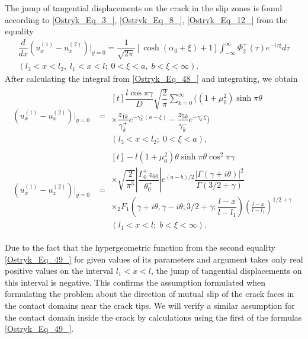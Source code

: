 The jump of tangential displacements on the crack in the slip zones is found according to \eqref{Ostryk_Eq_3_}, \eqref{Ostryk_Eq_8_}, \eqref{Ostryk_Eq_12_} from the equality
\begin{multline} \label{Ostryk_Eq_48_} 
\dfrac{d}{dx} \left(u_{x}^{(1)} -u_{x}^{(2)}\right)\Big|_{y=0} =\dfrac{1}{\sqrt{2\pi } } \left[\cosh (\alpha _{3} +\xi )+1\right]\int _{-\infty }^{\infty }\Phi _{2}^{+} (\tau )e^{-i\tau \xi } d\tau  
\\
(l_{3} <x<l_{2} ,\;  l_{1} <x<l;\;  0<\xi <a,\;  b<\xi <\infty ).  
\end{multline} 
After calculating the integral from \eqref{Ostryk_Eq_48_} and integrating, we obtain
\begin{equation} \label{Ostryk_Eq_49_} 
\begin{aligned}
	\left(u_{x}^{(1)} -u_{x}^{(2)} \right)\Big|_{y=0} &=
	\begin{multlined}[t]
		\dfrac{l\cos \pi \gamma }{D} \sqrt{\dfrac{2}{\pi } } \sum _{k=0}^{\infty }\bigg((1+\mu _{0}^{2} )\sinh \pi \theta
		\\
		\times \dfrac{z_{1k} }{\gamma _{k}^{+} } e^{-\gamma _{k}^{+} (a-\xi )} -\dfrac{z_{5k} }{\gamma _{k}^{-} } e^{-\gamma _{k}^{-} \xi } \bigg) 
		\\
		(l_{3} <x<l_{2} ;\;  0<\xi <a),
	\end{multlined} 
	\\
	\left(u_{x}^{(1)} -u_{x}^{(2)}\right)\Big|_{y=0} &=
	\begin{multlined}[t]
		-l(1+\mu _{0}^{2} )\theta \sinh \pi \theta \cos ^{2} \pi \gamma 
		\\
		\times \sqrt{\dfrac{2}{\pi ^{3} } } \left|\dfrac{\Gamma _{0}^{+} z_{60} }{\theta _{0}^{+} } \right|e^{(a-b)/2}  \dfrac{\left|\Gamma (\gamma +i\theta )\right|^{2} }{\Gamma (3/2 +\gamma )}
		\\
		\times {}_{2} F_{1} \left(\gamma +i\theta , \gamma -i\theta ; 3/2 +\gamma ; \dfrac{l-x}{l-l_{1} } \right)\left(\tfrac{l-x}{l-l_{1} } \right)^{1/2 +\gamma } 
		\\
		(l_{1} <x<l;\;  b<\xi <\infty ).  
	\end{multlined}
\end{aligned}
\end{equation} 

Due to the fact that the hypergeometric function from the second equality \eqref{Ostryk_Eq_49_} for given values of its parameters and argument takes only real positive values on the interval $l_{1} <x<l$, the jump of tangential displacements on this interval is negative. This confirms the assumption formulated when formulating the problem about the direction of mutual slip of the crack faces in the contact domains near the crack tips. We will verify a similar assumption for the contact domain inside the crack by calculations using the first of the formulas \eqref{Ostryk_Eq_49_}.





